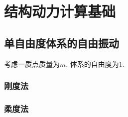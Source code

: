 \chapter{结构动力计算基础}

\section{单自由度体系的自由振动}

考虑一质点质量为$m$, 体系的自由度为$1$.


\subsection{刚度法}

\subsection{柔度法}